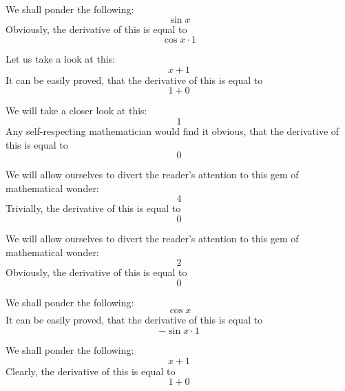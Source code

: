 \documentclass{article}
\begin{document}
We shall ponder the following:
\begin{equation}
\sin x 
\end{equation}
Obviously, the derivative of this is equal to
\begin{equation}
\cos x \cdot 1 
\end{equation}

Let us take a look at this:
\begin{equation}
x + 1 
\end{equation}
It can be easily proved, that the derivative of this is equal to
\begin{equation}
1 + 0 
\end{equation}

We will take a closer look at this:
\begin{equation}
1 
\end{equation}
Any self-respecting mathematician would find it obvious, that the derivative of this is equal to
\begin{equation}
0 
\end{equation}

We will allow ourselves to divert the reader's attention to this gem of mathematical wonder:
\begin{equation}
4 
\end{equation}
Trivially, the derivative of this is equal to
\begin{equation}
0 
\end{equation}

We will allow ourselves to divert the reader's attention to this gem of mathematical wonder:
\begin{equation}
2 
\end{equation}
Obviously, the derivative of this is equal to
\begin{equation}
0 
\end{equation}

We shall ponder the following:
\begin{equation}
\cos x 
\end{equation}
It can be easily proved, that the derivative of this is equal to
\begin{equation}
-\sin x \cdot 1 
\end{equation}

We shall ponder the following:
\begin{equation}
x + 1 
\end{equation}
Clearly, the derivative of this is equal to
\begin{equation}
1 + 0 
\end{equation}
\end{document}
